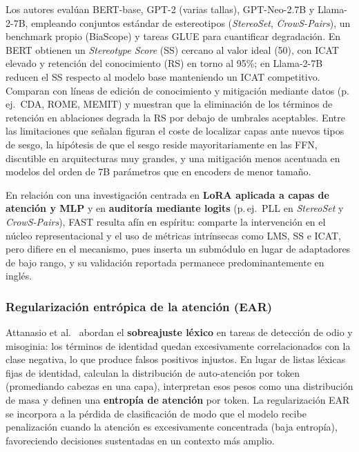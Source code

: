 \documentclass[12pt,a4paper]{report}
\begin{document}
Los autores evalúan BERT-base, GPT-2 (varias tallas), GPT-Neo-2.7B y Llama-2-7B, empleando conjuntos estándar de estereotipos (\textit{StereoSet}, \textit{CrowS-Pairs}), un benchmark propio (BiaScope) y tareas GLUE para cuantificar degradación. En BERT obtienen un \textit{Stereotype Score} (SS) cercano al valor ideal (50), con ICAT elevado y retención del conocimiento (RS) en torno al 95\%; en Llama-2-7B reducen el SS respecto al modelo base manteniendo un ICAT competitivo. Comparan con líneas de edición de conocimiento y mitigación mediante datos (p.\,ej.\ CDA, ROME, MEMIT) y muestran que la eliminación de los términos de retención en ablaciones degrada la RS por debajo de umbrales aceptables. Entre las limitaciones que señalan figuran el coste de localizar capas ante nuevos tipos de sesgo, la hipótesis de que el sesgo reside mayoritariamente en las FFN, discutible en arquitecturas muy grandes, y una mitigación menos acentuada en modelos del orden de 7B parámetros que en encoders de menor tamaño.

En relación con una investigación centrada en \textbf{LoRA aplicada a capas de atención y MLP} y en \textbf{auditoría mediante logits} (p.\,ej.\ PLL en \textit{StereoSet} y \textit{CrowS-Pairs}), FAST resulta afín en espíritu: comparte la intervención en el núcleo representacional y el uso de métricas intrínsecas como LMS, SS e ICAT, pero difiere en el mecanismo, pues inserta un submódulo en lugar de adaptadores de bajo rango, y su validación reportada permanece predominantemente en inglés.

\subsubsection{Regularización entrópica de la atención (EAR)}

Attanasio et al.\ \cite{attanasio_entropy-based_2022} abordan el \textbf{sobreajuste léxico} en tareas de detección de odio y misoginia: los términos de identidad quedan excesivamente correlacionados con la clase negativa, lo que produce falsos positivos injustos. En lugar de listas léxicas fijas de identidad, calculan la distribución de auto-atención por token (promediando cabezas en una capa), interpretan esos pesos como una distribución de masa y definen una \textbf{entropía de atención} por token. La regularización EAR se incorpora a la pérdida de clasificación de modo que el modelo recibe penalización cuando la atención es excesivamente concentrada (baja entropía), favoreciendo decisiones sustentadas en un contexto más amplio.
\end{document}
